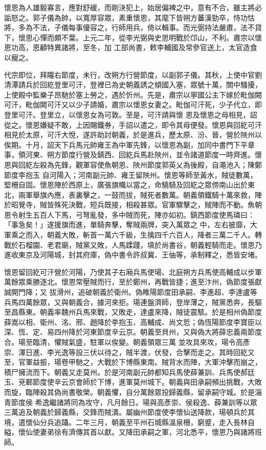 \begin{pinyinscope}
 懷恩為人雄毅寡言，應對舒緩，而剛決犯上，始居偏裨之中，意有不合，雖主將必詬怒之。郭子儀為帥，以寬厚容眾，素重懷恩，其麾下皆朔方蕃漢勁卒，恃功怙將，多為不法，子儀每事優容之，行師用兵，倚以輯事。而光弼持法嚴肅，法不貸下，懷恩心憚而頗不葉。上元二年，從李光弼與史思明戰於邙山，不利。肅宗以懷恩功高，恩顧特異諸將，至冬，加
 工部尚書，敕李輔國及常參官送上，太官造食以寵之。



 代宗即位，拜隴右節度，未行，改朔方行營節度，以副郭子儀。其秋，上使中官劉清潭請兵於回紇登里可汗，登裡已為史朝義誘之傾國入塞，眾號十萬，關中騷擾，上使殿中監樂子昂馳於塞上勞之，遇於忻州。先是，肅宗以寧國公主下嫁於毗伽闕可汗，毗伽闕可汗又以少子請婚，肅宗以懷恩女妻之。毗伽可汗死，少子代立，即登里可汗。登里立，以懷恩女為可敦。至是，可汗請與懷
 恩及懷恩之母相見，詔從之。懷恩嫌疑不敢，上因賜鐵券，手詔以遣之，即令其母便發。懷恩與回紇可汗相見於太原，可汗大悅，遂許助討朝義，於是進兵，歷太原、汾、晉，營於陜州以俟期。十月，詔天下兵馬元帥雍王為中軍先鋒，以懷恩為副，加同中書門下平章事，領河東、朔方節度行營及鎮西、回紇兵馬赴陜州，並令諸道節度一時齊進。懷恩與回紇左殺為先鋒，觀軍容使魚朝恩、陜州節度郭英乂為後殿，自澠池入；陳鄭節度李抱玉
 自河陽入；河南副元帥、雍王留陜州。懷恩等師至黃水，賊徒數萬，堅柵自固。懷恩陣於西原上，廣張旗幟以當之，命驍騎及回紇之眾傍南山出於東北，兩軍舉旗內應，表裏擊之，一鼓而拔，賊死者數萬。朝義領鐵騎十萬來救，陣於昭覺寺，賊皆殊死決戰，短兵既接，相殺甚眾。官軍驟擊之，賊陣而不動。魚朝恩令射生五百人下馬，弓弩亂發，多中賊而死，陣亦如初。鎮西節度使馬璘曰：「事急矣！」遂援旗而進，單騎奔擊，奪賊兩牌，突入萬眾之
 中，左右披靡，大軍乘之而入，朝義大敗，斬首一萬六千級，生擒四千六百人，降者三萬二千人。轉戰於石榴園、老君廟，賊黨又敗，人馬蹂踐，填於尚書谷，朝義輕騎而走。懷恩乃進收東京及河陽城，封其府庫，偽中書令許叔冀、王伷等，承制釋之，悉皆安堵。



 懷恩留回紇可汗營於河陽，乃使其子右廂兵馬使瑒、北庭朔方兵馬使高輔成以步軍萬餘眾乘勝逐北。懷恩常壓賊而行，至於鄭州，再戰皆捷；進至汴州，偽節度張獻誠開門降；又
 拔滑州，追破朝義於衛州。偽睢陽節度田承嗣、李進超、李達盧等兵馬四萬餘眾，又與朝義合，據河來拒。瑒連盤濟師，登岸薄之，賊黨悉奔，長驅至昌縣東。朝義率魏州兵馬來戰，又敗走，達盧來降，賊徒震駭。於是相州偽節度薛嵩以相、衛州、洺、邢、趙降於李抱玉、高輔成、尚文悊；偽恆陽節度李寶臣以深、恆、定、易四州降於河東節度辛云京。朝義至貝州，又與偽大將薛忠義兩節度合。瑒至臨清，懼賊氣盛，駐軍以俟變。朝義領眾三萬
 並攻具來攻，瑒令高彥崇、渾日進、李光逸等設三伏以待之，賊半渡，伏發，合擊而走之。其時回紇又至，官軍益振，瑒卷甲馳之，大戰於下博縣東南。賊背水而陣，大軍沖擊而崩之，積尸擁流而下。朝義又走莫州。於是河南副元帥都知兵馬使薛兼訓、兵馬使郝廷玉、兗鄆節度使辛云京會師於下博，進軍莫州城下。朝義與田承嗣頻出挑戰，大敗而旋，臨陣殺其偽尚書敬榮。朝義懼，自分萬餘眾投歸義縣，留承嗣守城。於是淄青節度侯
 希逸繼諸將同為攻守，凡月餘日。瑒與高彥崇、侯殺逸、薛兼訓等以眾三萬追及朝義於歸義縣，交鋒而賊潰。屬幽州節度使李懷仙送降款，瑒頓兵於其境，遣懷仙分兵追躡。二年三月，朝義至平州石城縣溫泉柵，窮蹙，走入長林自縊，懷仙使妻弟徐有濟傳其首以獻。又降田承嗣之軍，河北悉平，懷恩乃與諸將班師。




\end{pinyinscope}
